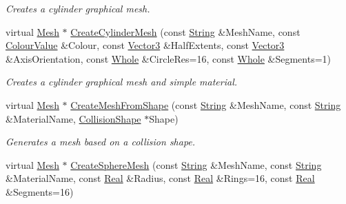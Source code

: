 \begin{DoxyCompactItemize}
\begin{DoxyCompactList}\small\item\em Creates a cylinder graphical mesh. \item\end{DoxyCompactList}\item 
virtual \hyperlink{classMezzanine_1_1Mesh}{Mesh} $\ast$ \hyperlink{classMezzanine_1_1MeshManager_aa2d52ca9f366145ce91ee68eb2d8c9a3}{CreateCylinderMesh} (const \hyperlink{namespaceMezzanine_acf9fcc130e6ebf08e3d8491aebcf1c86}{String} \&MeshName, const \hyperlink{classMezzanine_1_1ColourValue}{ColourValue} \&Colour, const \hyperlink{classMezzanine_1_1Vector3}{Vector3} \&HalfExtents, const \hyperlink{classMezzanine_1_1Vector3}{Vector3} \&AxisOrientation, const \hyperlink{namespaceMezzanine_adcbb6ce6d1eb4379d109e51171e2e493}{Whole} \&CircleRes=16, const \hyperlink{namespaceMezzanine_adcbb6ce6d1eb4379d109e51171e2e493}{Whole} \&Segments=1)
\begin{DoxyCompactList}\small\item\em Creates a cylinder graphical mesh and simple material. \item\end{DoxyCompactList}\item 
virtual \hyperlink{classMezzanine_1_1Mesh}{Mesh} $\ast$ \hyperlink{classMezzanine_1_1MeshManager_a75424e13a23151fa96ef0626962034a0}{CreateMeshFromShape} (const \hyperlink{namespaceMezzanine_acf9fcc130e6ebf08e3d8491aebcf1c86}{String} \&MeshName, const \hyperlink{namespaceMezzanine_acf9fcc130e6ebf08e3d8491aebcf1c86}{String} \&MaterialName, \hyperlink{classMezzanine_1_1CollisionShape}{CollisionShape} $\ast$Shape)
\begin{DoxyCompactList}\small\item\em Generates a mesh based on a collision shape. \item\end{DoxyCompactList}\item 
virtual \hyperlink{classMezzanine_1_1Mesh}{Mesh} $\ast$ \hyperlink{classMezzanine_1_1MeshManager_a237f66b9471261d6a0ef6d565740ea15}{CreateSphereMesh} (const \hyperlink{namespaceMezzanine_acf9fcc130e6ebf08e3d8491aebcf1c86}{String} \&MeshName, const \hyperlink{namespaceMezzanine_acf9fcc130e6ebf08e3d8491aebcf1c86}{String} \&MaterialName, const \hyperlink{namespaceMezzanine_a726731b1a7df72bf3583e4a97282c6f6}{Real} \&Radius, const \hyperlink{namespaceMezzanine_a726731b1a7df72bf3583e4a97282c6f6}{Real} \&Rings=16, const \hyperlink{namespaceMezzanine_a726731b1a7df72bf3583e4a97282c6f6}{Real} \&Segments=16)

\end{DoxyCompactItemize}
